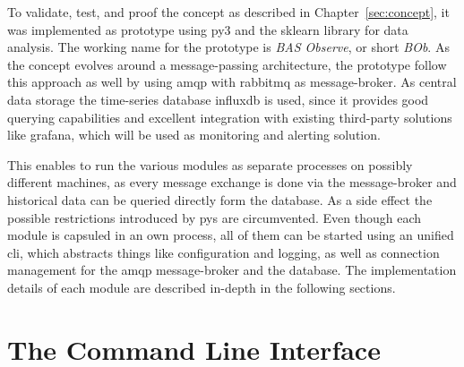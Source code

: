 
\begin{comment}
\begin{itemize}
	\item implementation in \gls{py} 3
	\item command line interface with subcommand as central entrypoint providing configuration and log management
	\item each process is run as separate processes to mitigate \gls{gil} limitations
	\item process has one task (agent simulator, collector, analyser module)
	\item modules/process pass messages mainly using \gls{amqp} and \gls{rabbitmq} as message broker
	\item reusing \gls{influxdb} and \gls{rabbitmq} by separating pipelines using a project name
\end{itemize}
\end{comment}

To validate, test, and proof the concept as described in Chapter~\ref{sec:concept}, it was implemented as prototype using \gls{py}3 and the \gls{sklearn} library for data analysis.
The working name for the prototype is \emph{BAS Observe}, or short \emph{BOb}.
As the concept evolves around a message-passing architecture, the prototype follow this approach as well by using \gls{amqp} with \gls{rabbitmq} as message-broker. As central data storage the time-series database \gls{influxdb} is used, since it provides good querying capabilities and excellent integration with existing third-party solutions like \gls{grafana}, which will be used as monitoring and alerting solution.

This enables to run the various modules as separate processes on possibly different machines, as every message exchange is done via the message-broker and historical data can be queried directly form the database.
As a side effect the possible restrictions introduced by \gls{py}s  are circumvented.
Even though each module is capsuled in an own process, all of them can be started using an unified \gls{cli}, which abstracts things like configuration and logging, as well as connection management for the \gls{amqp} message-broker and the database.
The implementation details of each module are described in-depth in the following sections.

\section{The Command Line Interface}
\label{sec:impl:cli}

